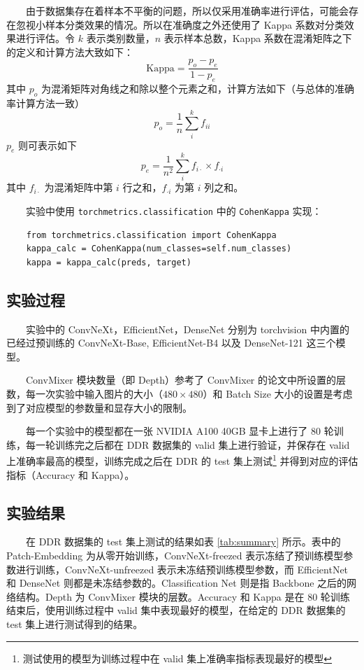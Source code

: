 \documentclass[twocolumn, fontsize=10pt]{article}
\begin{document}
　　由于数据集存在着样本不平衡的问题，所以仅采用准确率进行评估，可能会存在忽视小样本分类效果的情况。所以在准确度之外还使用了 Kappa 系数\cite{cohen1960}对分类效果进行评估。令 $k$ 表示类别数量，$n$ 表示样本总数，Kappa 系数在混淆矩阵之下的定义和计算方法大致如下：
$$
\mathrm{Kappa} = \frac{p_o-p_e}{1-p_e}
$$
其中 $p_o$ 为混淆矩阵对角线之和除以整个元素之和，计算方法如下（与总体的准确率计算方法一致）
$$
p_o = \frac{1}{n}\sum_i^k f_{ii}
$$
$p_e$ 则可表示如下
$$
p_e = \frac{1}{n^2}\sum_i^k f_{i\cdot}\times f_{\cdot i}
$$
其中 $f_{i\cdot}$ 为混淆矩阵中第 $i$ 行之和，$f_{\cdot i}$ 为第 $i$ 列之和。

　　实验中使用 \texttt{torchmetrics.classification} 中的 \texttt{CohenKappa} 实现：
\begin{verbatim}
    from torchmetrics.classification import CohenKappa
    kappa_calc = CohenKappa(num_classes=self.num_classes)
    kappa = kappa_calc(preds, target)
\end{verbatim}


\subsection{实验过程}



　　实验中的 ConvNeXt，EfficientNet，DenseNet 分别为 torchvision 中内置的已经过预训练的 ConvNeXt-Base, EfficientNet-B4 以及 DenseNet-121 这三个模型。

　　ConvMixer 模块数量（即 Depth）参考了 ConvMixer 的论文中所设置的层数，每一次实验中输入图片的大小（$480\times 480$）和 Batch Size 大小的设置是考虑到了对应模型的参数量和显存大小的限制。

　　每一个实验中的模型都在一张 NVIDIA A100 40GB 显卡上进行了 80 轮训练，每一轮训练完之后都在 DDR 数据集的 valid 集上进行验证，并保存在 valid 上准确率最高的模型，训练完成之后在 DDR 的 test 集上测试\footnote{测试使用的模型为训练过程中在 valid 集上准确率指标表现最好的模型} 并得到对应的评估指标（Accuracy 和 Kappa）。



\subsection{实验结果}

　　在 DDR 数据集的 test 集上测试的结果如表 \ref{tab:summary} 所示。表中的 Patch-Embedding 为从零开始训练，ConvNeXt-freezed 表示冻结了预训练模型参数进行训练，ConvNeXt-unfreezed 表示未冻结预训练模型参数，而 EfficientNet 和 DenseNet 则都是未冻结参数的。Classification Net 则是指 Backbone 之后的网络结构。Depth 为 ConvMixer 模块的层数。Accuracy 和 Kappa 是在 80 轮训练结束后，使用训练过程中 valid 集中表现最好的模型，在给定的 DDR 数据集的 test 集上进行测试得到的结果。
\end{document}
